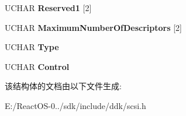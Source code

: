 \begin{DoxyCompactItemize}
U\+C\+H\+AR {\bfseries Reserved1} \mbox{[}2\mbox{]}
\item 
\mbox{\label{struct___c_d_b_1_1___g_e_t___p_e_r_f_o_r_m_a_n_c_e_a323dc1ce7ede2cea829e0c9464456ee2}} 
U\+C\+H\+AR {\bfseries Maximum\+Number\+Of\+Descriptors} \mbox{[}2\mbox{]}
\item 
\mbox{\label{struct___c_d_b_1_1___g_e_t___p_e_r_f_o_r_m_a_n_c_e_a2011c93e5949615d11c826fb8bb1e791}} 
U\+C\+H\+AR {\bfseries Type}
\item 
\mbox{\label{struct___c_d_b_1_1___g_e_t___p_e_r_f_o_r_m_a_n_c_e_a1d667305dfba8a28d86992f7b921a864}} 
U\+C\+H\+AR {\bfseries Control}
\end{DoxyCompactItemize}


该结构体的文档由以下文件生成\+:\begin{DoxyCompactItemize}
\item 
E\+:/\+React\+O\+S-\/0../sdk/include/ddk/scsi.\+h\end{DoxyCompactItemize}
